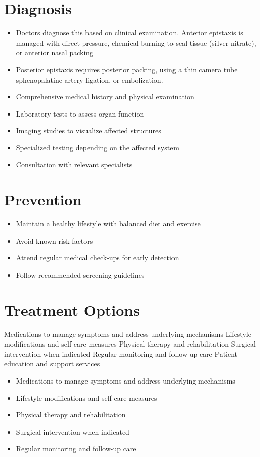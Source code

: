 \section{Diagnosis}
\begin{itemize}[noitemsep]
  \item Doctors diagnose this based on clinical examination. Anterior epistaxis is managed with direct pressure, chemical burning to seal tissue (silver nitrate), or anterior nasal packing
  \item Posterior epistaxis requires posterior packing, using a thin camera tube sphenopalatine artery ligation, or embolization.
  \item Comprehensive medical history and physical examination
  \item Laboratory tests to assess organ function
  \item Imaging studies to visualize affected structures
  \item Specialized testing depending on the affected system
  \item Consultation with relevant specialists
\end{itemize}
\section{Prevention}
\begin{itemize}[noitemsep]
  \item Maintain a healthy lifestyle with balanced diet and exercise
  \item Avoid known risk factors
  \item Attend regular medical check-ups for early detection
  \item Follow recommended screening guidelines
\end{itemize}
\section{Treatment Options}
Medications to manage symptoms and address underlying mechanisms Lifestyle modifications and self-care measures Physical therapy and rehabilitation Surgical intervention when indicated Regular monitoring and follow-up care Patient education and support services

\begin{itemize}[noitemsep]
  \item Medications to manage symptoms and address underlying mechanisms
  \item Lifestyle modifications and self-care measures
  \item Physical therapy and rehabilitation
  \item Surgical intervention when indicated
  \item Regular monitoring and follow-up care
\end{itemize}
